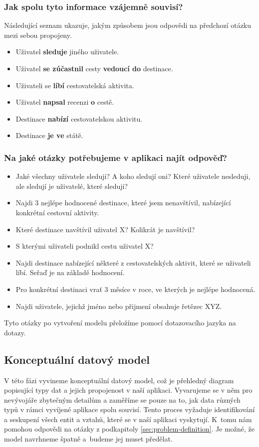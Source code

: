 \documentclass[
  program=infoi,
  biblatex=true,
  figures=true,
  glossaries=false,
  index,
  sourcecodes=true
]{kidiplom}
\begin{document}
\subsubsection{Jak spolu tyto informace vzájemně souvisí?}
Následující seznam ukazuje, jakým způsobem jsou odpovědi na předchozí otázku mezi sebou propojeny. 
\begin{itemize}
  \item Uživatel \textbf{sleduje} jiného uživatele.
  \item Uživatel \textbf{se zúčastnil} cesty \textbf{vedoucí do} destinace.
  \item Uživateli se \textbf{líbí} cestovatelská aktivita.
  \item Uživatel \textbf{napsal} recenzi \textbf{o} cestě.
  \item Destinace \textbf{nabízí} cestovatelskou aktivitu.
  \item Destinace \textbf{je ve} státě.
\end{itemize}

\subsubsection{Na jaké otázky potřebujeme v aplikaci najít odpověď?}
\begin{itemize}
  \item Jaké všechny uživatele sleduji? A koho sledují oni? Které uživatele nesleduji, ale sledují je uživatelé, které sleduji?
  \item Najdi 3 nejlépe hodnocené destinace, které jsem nenavštívil, nabízející konkrétní cestovní aktivity.
  \item Které destinace navštívil uživatel X? Kolikrát je navštívil?
  \item S kterými uživateli podnikl cestu uživatel X?
  \item Najdi destinace nabízející některé z cestovatelských aktivit, které se uživateli líbí. Seřaď je na základě hodnocení.
  \item Pro konkrétní destinaci vrať 3 měsíce v roce, ve kterých je nejlépe hodnocená.
  \item Najdi uživatele, jejichž jméno nebo přijmení obsahuje řetězec XYZ. 
\end{itemize}
Tyto otázky po vytvoření modelu přeložíme pomocí dotazovacího jazyka na dotazy.
 
\subsection{Konceptuální datový model}
V této fázi vyvineme konceptuální datový model, což je přehledný diagram popisující typy dat a jejich propojenost v naší aplikaci. Vyvarujeme se v něm pro nevývojáře zbytečným detailům a zaměříme se pouze na to, jak data různých typů v rámci vyvíjené aplikace spolu souvisí. Tento proces vyžaduje identifikování a seskupení všech entit a vztahů, které se v naší aplikaci vyskytují. K~tomu nám pomohou odpovědi na otázky z podkapitoly \ref{sec:problem-definition}. Je možné, že model navrhneme špatně a~budeme jej muset předělat.
\end{document}
